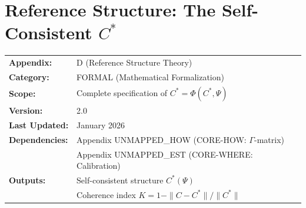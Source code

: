 \section{Reference Structure: The Self-Consistent $C^*$}
\label{app:formal-cstar}



\begin{tcolorbox}[colback=blue!5!white, colframe=blue!75!black,
    title=\textbf{Appendix UNMAPPED_PRF: FORMAL-CSTAR}]

\begin{tabular}{@{}ll@{}}
\textbf{Appendix:} & D (Reference Structure Theory) \\
\textbf{Category:} & FORMAL (Mathematical Formalization) \\
\textbf{Scope:} & Complete specification of $C^* = \Phi(C^*, \Psi)$ \\
\textbf{Version:} & 2.0 \\
\textbf{Last Updated:} & January 2026 \\
\textbf{Dependencies:} & Appendix UNMAPPED_HOW (CORE-HOW: $\Gamma$-matrix) \\
                       & Appendix UNMAPPED_EST (CORE-WHERE: Calibration) \\
\textbf{Outputs:} & Self-consistent structure $C^*(\Psi)$ \\
                  & Coherence index $K = 1 - \|C - C^*\|/\|C^*\|$ \\
\end{tabular}

\end{tcolorbox}


